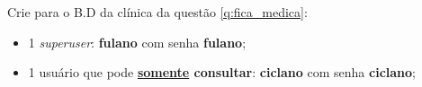 \documentclass[12pt]{exam}
\begin{document}
\begin{questions}
\question[1.0] Crie para o B.D da clínica da questão  \ref{q:fica_medica}:

\begin{itemize}
    \item 1 \textit{superuser}: \textbf{fulano} com senha \textbf{fulano};
    \item 1 usuário que pode \textbf{\underline{somente} consultar}: \textbf{ciclano} com senha 
    \textbf{ciclano};
\end{itemize}












   
  

\end{questions}
\end{document}
